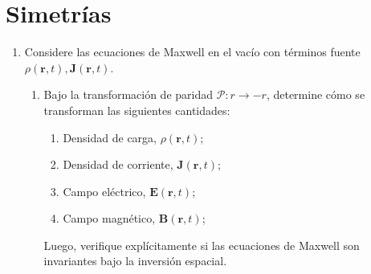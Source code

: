 \documentclass[]{article}
\numberwithin{equation}{section}
\newcommand{\0}{\textcolor{gray}{0}}
\newcommand{\rv}{\mathbf{r}}
\newcommand{\n}[1]{\mathbf{#1}}
\begin{document}
\section{Simetrías}
\begin{enumerate}
	\item Considere las ecuaciones de Maxwell en el vacío con términos fuente \(\rho(\rv,t), \n{J}(\rv,t)\).
	\begin{enumerate}
		\item Bajo la transformación de paridad \(\mathcal{P}: r \rightarrow -r\), determine cómo se transforman las siguientes cantidades:
		\begin{enumerate}
			\item Densidad de carga, \(\rho(\rv, t)\);
			\item Densidad de corriente, \(\n{J}(\rv, t)\);
			\item Campo eléctrico, \(\n{E}(\rv, t)\);
			\item Campo magnético, \(\n{B}(\rv, t)\);
		\end{enumerate}
		Luego, verifique explícitamente si las ecuaciones de Maxwell son invariantes bajo la inversión espacial.
		

\end{enumerate}
\end{enumerate}
\end{document}
